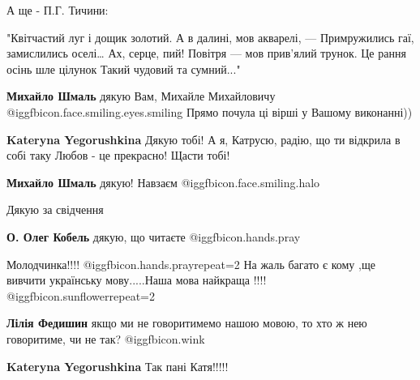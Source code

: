 \begin{itemize}
А ще - П.Г. Тичини: 

\obeycr
"Квітчастий луг і дощик золотий.
А в далині, мов акварелі, —
Примружились гаї, замислились оселі…
Ах, серце, пий!
Повітря — мов прив’ялий трунок.
Це рання осінь шле цілунок
Такий чудовий та сумний..."
\restorecr

\begin{itemize} %
\textbf{Михайло Шмаль} дякую Вам, Михайле Михайловичу @igg{fbicon.face.smiling.eyes.smiling} 
Прямо почула ці вірші у Вашому виконанні))

\textbf{Kateryna Yegorushkina} Дякую тобі! А я, Катрусю, радію, що ти відкрила в собі таку Любов - це прекрасно! Щасти тобі!

\textbf{Михайло Шмаль} дякую! Навзаєм @igg{fbicon.face.smiling.halo} 
\end{itemize} %

Дякую за свідчення

\begin{itemize} %
\textbf{О. Олег Кобель} дякую, що читаєте @igg{fbicon.hands.pray} 
\end{itemize} %

Молодчинка!!!! @igg{fbicon.hands.pray}{repeat=2} На жаль багато є кому ,ще вивчити українську мову.....Наша
мова найкраща !!!! @igg{fbicon.sunflower}{repeat=2} 

\begin{itemize} %
\textbf{Лілія Федишин} якщо ми не говоритимемо нашою мовою, то хто ж нею говоритиме, чи не так? @igg{fbicon.wink} 

\textbf{Kateryna Yegorushkina} Так пані Катя!!!!!🍁🍁
\end{itemize} %


\end{itemize} %
